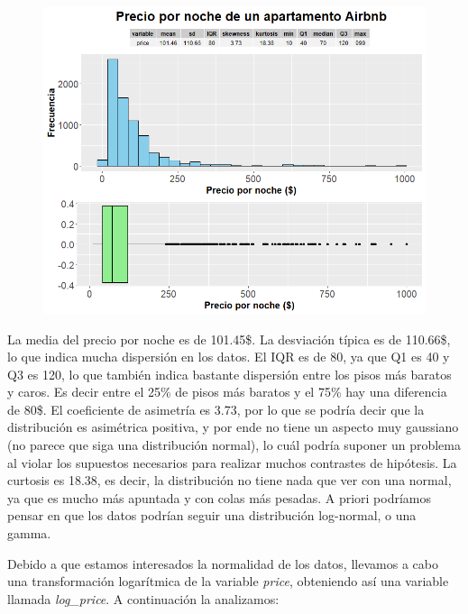 \documentclass{article}
\begin{document}
\vspace{0.35cm}
\begin{figure}[h]
\hspace*{-0.15cm}
\centering
\includegraphics[scale = 0.6]{grafico_precio}
\end{figure}
\vspace{0.15cm}

La media del precio por noche es de 101.45\$.
La desviación típica es de 110.66\$, lo que indica mucha dispersión en los datos.
El IQR es de 80, ya que Q1 es 40 y Q3 es 120, lo que también indica bastante dispersión entre los pisos más baratos y caros. Es decir entre el 25\% de pisos más baratos y el 75\% hay una diferencia de 80\$.
El coeficiente de asimetría es 3.73, por lo que se podría decir que la distribución es asimétrica positiva, y por ende no tiene un aspecto muy gaussiano (no parece que siga una distribución normal), lo cuál podría suponer un problema al violar los supuestos necesarios para realizar muchos contrastes de hipótesis. 
La curtosis es 18.38, es decir, la distribución no tiene nada que ver con una normal, ya que es mucho más apuntada y con colas más pesadas. A priori podríamos pensar en que los datos podrían seguir una distribución log-normal, o una gamma. 

\clearpage
Debido a que estamos interesados la normalidad de los datos, llevamos a cabo una transformación logarítmica de la variable \emph{price}, obteniendo así una variable llamada \emph{log\_price}. A continuación la analizamos:
\end{document}
